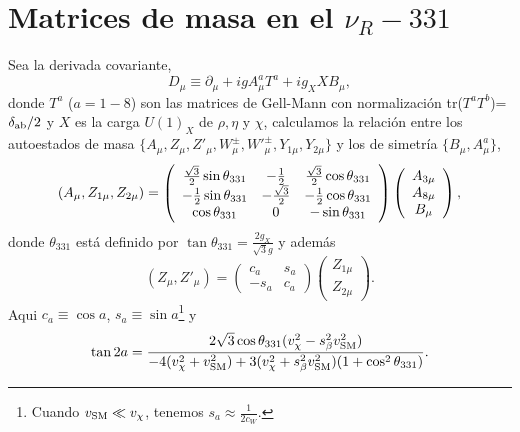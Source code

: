 \section*{Matrices de masa en el $\nu_R-331$}

Sea la derivada covariante,
\begin{equation}
D_\mu \equiv \partial_\mu + ig A_\mu^a T^a + i g_X X B_\mu, 
\end{equation}
donde $T^a$ ($a=1-8$) son las matrices de Gell-Mann con normalización tr($T^aT^b$)=$\delta_{\rm ab}/2$ y $X$ es la carga $U(1)_X$ de $\rho, \eta$ y $\chi$, calculamos la relación entre los autoestados de masa $\{ A_{\mu},Z_{\mu}, Z'_{\mu},W_{\mu}^{\pm}, W'^{\pm}_{\mu},Y_{1\mu},Y_{2\mu} \}$ y los de simetría $\{B_{\mu}, A^a_{\mu}\}$,
\begin{equation}
(A_{\mu},Z_{1\mu}, Z_{2\mu}) = 
\left(
\begin{array}{ccccc}
\frac{\sqrt{3}}{2} \sin \theta_{\rm 331} & -\frac{1}{2} & \frac{\sqrt{3}}{2} \cos \theta_{\rm 331} \\
 -\frac{1}{2}\sin \theta_{\rm 331} & -\frac{\sqrt{3}}{2} & -\frac{1}{2} \cos \theta_{\rm 331} \\
 \cos \theta_{\rm 331} & 0 & -\sin \theta_{\rm 331} 
\end{array}
\right)
\left(
\begin{array}{c}
A_{3\mu} \\
A_{8\mu} \\
B_{\mu}  
\end{array}
\right),
\end{equation}
donde $\theta_{331}$ está definido por $\tan \theta_{331} = \frac{2g_X}{\sqrt{3}g}$ y además
\begin{equation}
\left(Z_{\mu},Z'_{\mu}\right) =
\left(
\begin{array}{cc}
 c_a & s_a \\
 -s_a & c_a 
\end{array}
\right)
\left(
\begin{array}{c}
 Z_{1\mu}  \\
 Z_{2\mu}  
\end{array}
\right).
\end{equation}
Aqui $c_a\equiv \cos a$, $s_a\equiv \sin a$\footnote{Cuando $v_{\rm SM} \ll v_\chi$, tenemos $s_a \approx \frac{1}{2c_W}$.} y
\begin{equation}
\tan 2a = \frac{2\sqrt{3}\cos \theta_{331}(v_\chi^2-s_\beta^2 v_{\rm SM}^2)}{-4(v_\chi^2 + v_{\rm SM}^2) + 3 (v_\chi^2 + s_\beta^2v_{\rm SM}^2)(1+\cos^2 \theta_{331})}.
\label{tan2a}
\end{equation}

